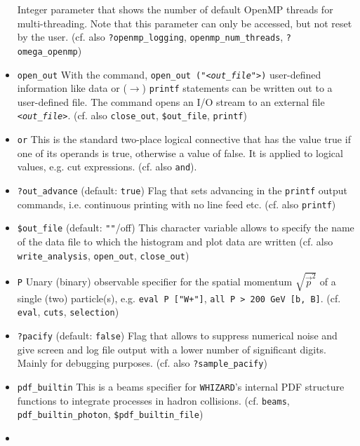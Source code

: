 \documentclass[12pt]{book}
\newcommand{\ttt}[1]{\texttt{#1}}
\newcommand{\whizard}{\texttt{WHIZARD}}
\begin{document}
\begin{itemize}
Integer parameter that shows the number of default OpenMP threads for
multi-threading. Note that this parameter can only be accessed, but
not reset by the user. (cf. also \ttt{?openmp\_logging},
\ttt{openmp\_num\_threads},
\ttt{?omega\_openmp})
\item
\ttt{open\_out} \newline
With the command, \ttt{open\_out ("{\em <out\_file">})} user-defined
information like data or ($\to$) \ttt{printf} statements can be
written out to a user-defined file. The command opens an I/O stream to
an external file \ttt{{\em <out\_file>}}. (cf. also \ttt{close\_out},
\ttt{\$out\_file}, \ttt{printf})
\item
\ttt{or} \newline
This is the standard two-place logical connective that has the value
true if one of its operands is true, otherwise a value of false. It
is applied to logical values, e.g. cut expressions. (cf. also
\ttt{and}).
\item
\ttt{?out\_advance} \qquad (default: \ttt{true}) \newline
Flag that sets advancing in the \ttt{printf} output commands,
i.e. continuous printing with no line feed etc. (cf. also \ttt{printf})
\item 
\ttt{\$out\_file} \qquad (default: \ttt{""}/off) \newline
This character variable allows to specify the name of the data file to
which the histogram and plot data are written (cf. also 
\ttt{write\_analysis}, \ttt{open\_out}, \ttt{close\_out})
\item
\ttt{P} \newline
Unary (binary) observable specifier for the spatial momentum
$\sqrt{\vec{p}^2}$ of a single (two) particle(s), e.g. \ttt{eval P
["W+"]}, \ttt{all P > 200 GeV [b, B]}. (cf. \ttt{eval}, \ttt{cuts},
\ttt{selection})
\item
\ttt{?pacify} \qquad (default: \ttt{false}) \newline
Flag that allows to suppress numerical noise and give screen and log
file output with a lower number of significant digits. Mainly for
debugging purposes. (cf. also \ttt{?sample\_pacify})
\item
\ttt{pdf\_builtin} \newline
This is a beams specifier for \whizard's internal PDF structure
functions to integrate processes in hadron collisions.
(cf. \ttt{beams}, \ttt{pdf\_builtin\_photon}, 
\ttt{\$pdf\_builtin\_file}) 
\item

\end{itemize}
\end{document}
